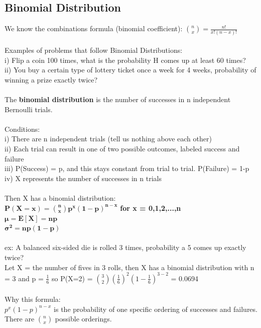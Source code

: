 \documentclass[12pt, a4paper]{article}
\begin{document}
	\subsection{Binomial Distribution}
	We know the combinations formula (binomial coefficient): $\binom{n}{x} = \frac{n!}{x!(n-x)!}$ \\~\\
	Examples of problems that follow Binomial Distributions: \\
	i) Flip a coin 100 times, what is the probability H comes up at least 60 times? \\
	ii) You buy a certain type of lottery ticket once a week for 4 weeks, probability of winning a prize exactly twice? \\~\\
	The \textbf{binomial distribution} is the number of successes in n independent Bernoulli trials. \\~\\
	Conditions: \\
	i) There are n independent trials (tell us nothing above each other) \\
	ii) Each trial can result in one of two possible outcomes, labeled success and failure \\
	iii) P(Success) = p, and this stays constant from trial to trial. P(Failure) = 1-p \\
	iv) X represents the number of successes in n trials \\~\\
	Then X has a binomial distribution: \\
	$\mathbf{P(X=x) = \binom{n}{x}p^x(1-p)^{n-x}}$ \textbf{for x = 0,1,2,...,n} \\
	$\mathbf{\mu = E[X] = np}$ \\
	$\mathbf{\sigma^2 = np(1-p)}$ \\~\\
	ex: A balanced six-sided die is rolled 3 times, probability a 5 comes up exactly twice? \\
	Let X = the number of fives in 3 rolls, then X has a binomial distribution with n = 3 and p = $\frac{1}{6}$ so P(X=2) = $\binom{3}{2}(\frac{1}{6})^2(1-\frac{1}{6})^{3-2}$ = 0.0694 \\~\\	
	Why this formula: \\
	$p^x(1-p)^{n-x}$ is the probability of one specific ordering of successes and failures. There are $\binom{n}{x}$ possible orderings. \\~\\
\end{document}

